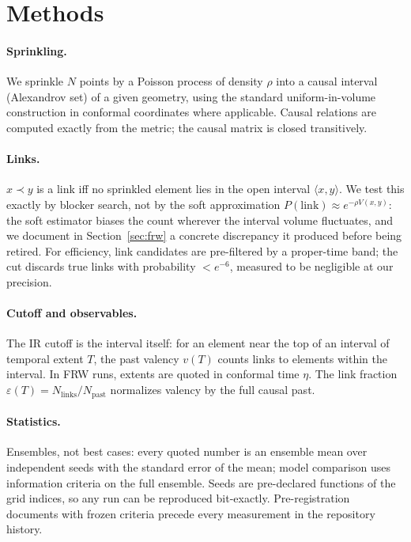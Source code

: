 \documentclass[11pt,a4paper]{article}
\begin{document}
\section{Methods}
\label{sec:methods}

\paragraph{Sprinkling.} We sprinkle $N$ points by a Poisson process of density
$\rho$ into a causal interval (Alexandrov set) of a given geometry, using the
standard uniform-in-volume construction in conformal coordinates where
applicable. Causal relations are computed exactly from the metric; the causal
matrix is closed transitively.

\paragraph{Links.} $x \prec y$ is a link iff no sprinkled element lies in the
open interval $\langle x, y\rangle$. We test this exactly by blocker search,
not by the soft approximation $P(\mathrm{link}) \approx e^{-\rho V(x,y)}$: the
soft estimator biases the count wherever the interval volume fluctuates, and
we document in Section~\ref{sec:frw} a concrete discrepancy it produced before
being retired. For efficiency, link candidates are pre-filtered by a
proper-time band; the cut discards true links with probability $< e^{-6}$,
measured to be negligible at our precision.

\paragraph{Cutoff and observables.} The IR cutoff is the interval itself: for
an element near the top of an interval of temporal extent $T$, the past
valency $v(T)$ counts links to elements within the interval. In FRW runs,
extents are quoted in conformal time $\eta$. The link fraction
$\varepsilon(T) = N_{\mathrm{links}}/N_{\mathrm{past}}$ normalizes valency by
the full causal past.

\paragraph{Statistics.} Ensembles, not best cases: every quoted number is an
ensemble mean over independent seeds with the standard error of the mean;
model comparison uses information criteria on the full ensemble. Seeds are
pre-declared functions of the grid indices, so any run can be reproduced
bit-exactly. Pre-registration documents with frozen criteria precede every
measurement in the repository history.
\end{document}
